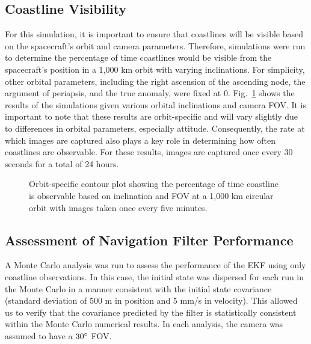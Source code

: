 \documentclass[]{aiaa-tc}%
\begin{document}
\subsection{Coastline Visibility}
For this simulation, it is important to ensure that coastlines will be visible based on the spacecraft's orbit and camera parameters.  Therefore, simulations were run to determine the percentage of time coastlines would be visible from the spacecraft's position in a 1,000 km orbit with varying inclinations.  For simplicity, other orbital parameters, including the right ascension of the ascending node, the argument of periapsis, and the true anomaly, were fixed at 0\degree.  Fig.~\ref{fig:contourplot} shows the results of the simulations given various orbital inclinations and camera FOV.  It is important to note that these results are orbit-specific and will vary slightly due to differences in orbital parameters, especially attitude. Consequently, the rate at which images are captured also plays a key role in determining how often coastlines are observable.  For these results, images are captured once every 30 seconds for a total of 24 hours.
\begin{figure}[h!]
\centering
{} %
\caption{Orbit-specific contour plot showing the percentage of time coastline is observable based on inclination and FOV at a 1,000 km circular orbit with images taken once every five minutes.}
\label{fig:contourplot}
\end{figure}

\subsection{Assessment of Navigation Filter Performance}
A Monte Carlo analysis was run to assess the performance of the EKF using only coastline observations.  In this case, the initial state was dispersed for each run in the Monte Carlo in a manner consistent with the initial state covariance (standard deviation of 500 m in position and 5 mm/s in velocity).  This allowed us to verify that the covariance predicted by the filter is statistically consistent within the Monte Carlo numerical results.  In each analysis, the camera was assumed to have a $30\degree $ FOV.
\end{document}
